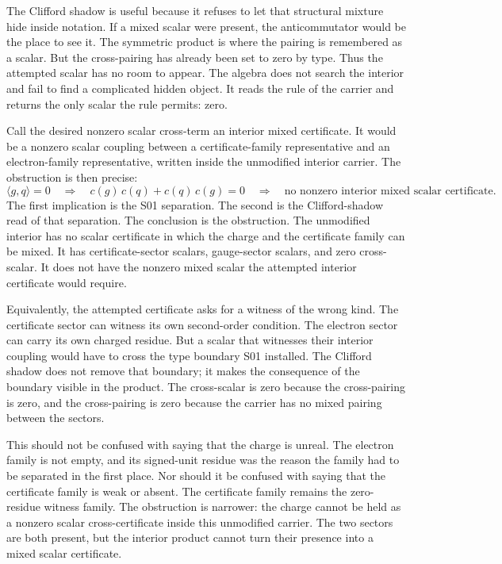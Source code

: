 The Clifford shadow is useful because it refuses to let that structural mixture
hide inside notation. If a mixed scalar were present, the anticommutator would
be the place to see it. The symmetric product is where the pairing is remembered
as a scalar. But the cross-pairing has already been set to zero by type. Thus
the attempted scalar has no room to appear. The algebra does not search the
interior and fail to find a complicated hidden object. It reads the rule of the
carrier and returns the only scalar the rule permits: zero.

Call the desired nonzero scalar cross-term an interior mixed certificate. It
would be a nonzero scalar coupling between a certificate-family representative
and an electron-family representative, written inside the unmodified interior
carrier. The obstruction is then precise:
\[
  \langle g, q \rangle = 0
  \quad\Longrightarrow\quad
  c(g)\,c(q) + c(q)\,c(g) = 0
  \quad\Longrightarrow\quad
  \text{no nonzero interior mixed scalar certificate.}
\]
The first implication is the S01 separation. The second is the Clifford-shadow
read of that separation. The conclusion is the obstruction. The unmodified
interior has no scalar certificate in which the charge and the certificate
family can be mixed. It has certificate-sector scalars, gauge-sector scalars,
and zero cross-scalar. It does not have the nonzero mixed scalar the attempted
interior certificate would require.

Equivalently, the attempted certificate asks for a witness of the wrong kind.
The certificate sector can witness its own second-order condition. The electron
sector can carry its own charged residue. But a scalar that witnesses their
interior coupling would have to cross the type boundary S01 installed. The
Clifford shadow does not remove that boundary; it makes the consequence of the
boundary visible in the product. The cross-scalar is zero because the
cross-pairing is zero, and the cross-pairing is zero because the carrier has no
mixed pairing between the sectors.

This should not be confused with saying that the charge is unreal. The electron
family is not empty, and its signed-unit residue was the reason the family had
to be separated in the first place. Nor should it be confused with saying that
the certificate family is weak or absent. The certificate family remains the
zero-residue witness family. The obstruction is narrower: the charge cannot be
held as a nonzero scalar cross-certificate inside this unmodified carrier. The
two sectors are both present, but the interior product cannot turn their
presence into a mixed scalar certificate.

